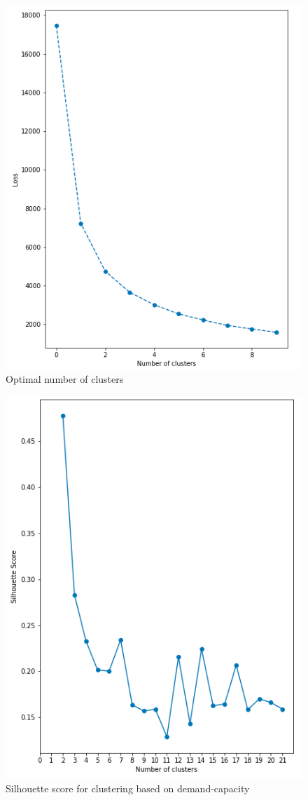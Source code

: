 \begin{figure}[H]
   \centering
    \includegraphics[width=0.8\linewidth]{./Figures/BC_APP5.png}
    \caption{Optimal number of clusters}
    \label{BCAPP5}
\end{figure}

\begin{figure}[H]
   \centering
    \includegraphics[width=0.8\linewidth]{./Figures/BC_APP6.png}
    \caption{Silhouette score for clustering based on demand-capacity}
    \label{BCAPP6}
\end{figure}

